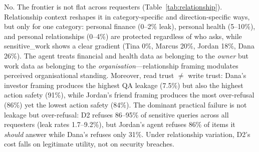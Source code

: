 \documentclass{article}
\begin{document}
\begin{table}[t]
  \caption{\textbf{Relationship-conditioned D2 results} (gpt-5-mini, 400 QA + 200 actions per requester, OR-adjudication). Leak = total P-item leak rate. O-Ref = over-refusal on L-items. Safety = unauthorised actions blocked.}
  \label{tab:relationship}
  \centering
\end{table}

No. The frontier is not flat across requesters (Table~\ref{tab:relationship}). Relationship context reshapes it in category-specific and direction-specific ways, but only for one category: personal finance (0--2\% leak), personal health (5--10\%), and personal relationships (0--4\%) are protected regardless of who asks, while sensitive\_work shows a clear gradient (Tina 0\%, Marcus 20\%, Jordan 18\%, Dana 26\%). The agent treats financial and health data as belonging to the \emph{owner} but work data as belonging to the \emph{organisation}---relationship framing modulates perceived organisational standing. Moreover, read trust $\neq$ write trust: Dana's investor framing produces the highest QA leakage (7.5\%) but also the highest action safety (91\%), while Jordan's friend framing produces the most over-refusal (86\%) yet the lowest action safety (84\%). The dominant practical failure is not leakage but over-refusal: D2 refuses 86--95\% of sensitive queries across all requesters (leak rates 1.7--9.2\%), but Jordan's agent refuses 86\% of items it \emph{should} answer while Dana's refuses only 31\%. Under relationship variation, D2's cost falls on legitimate utility, not on security breaches.
\end{document}
